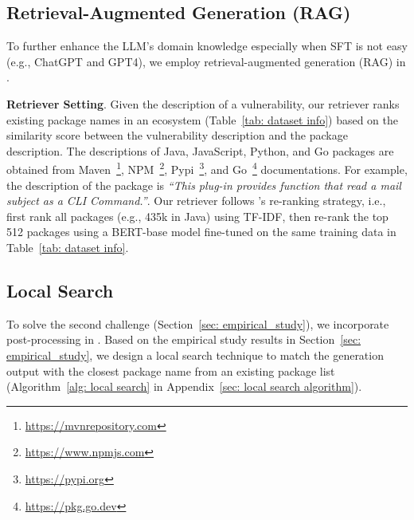 \subsection{Retrieval-Augmented Generation (RAG)}

To further enhance the LLM's domain knowledge especially when SFT is not easy (e.g., ChatGPT and GPT4), we employ retrieval-augmented generation (RAG) in \detector{}.

\noindent \textbf{Retriever Setting}. Given the description of a vulnerability, our retriever ranks existing package names in an ecosystem (Table~\ref{tab: dataset info}) based on the similarity score between the vulnerability description and the package description. The descriptions of Java, JavaScript, Python, and Go packages are obtained from Maven~\footnote{\url{https://mvnrepository.com}}, NPM~\footnote{\url{https://www.npmjs.com}}, Pypi~\footnote{\url{https://pypi.org}}, and Go~\footnote{\url{https://pkg.go.dev}} documentations.
For example, the description of the package  is \textit{``This plug-in provides function that read a mail subject as a CLI Command.''}.
Our retriever follows \cite{vullibminer}'s re-ranking strategy, i.e., first rank all packages (e.g., 435k in Java) using TF-IDF, then re-rank the top 512 packages using a BERT-base model fine-tuned on the same training data in Table~\ref{tab: dataset info}.



\subsection{Local Search}

To solve the second challenge (Section~\ref{sec: empirical_study}), we incorporate post-processing in \detector{}.
Based on the empirical study results in Section~\ref{sec: empirical_study}, we design a local search technique to match the generation output with the closest package name from an existing package list (Algorithm~\ref{alg: local search} in Appendix~\ref{sec: local search algorithm}). 


